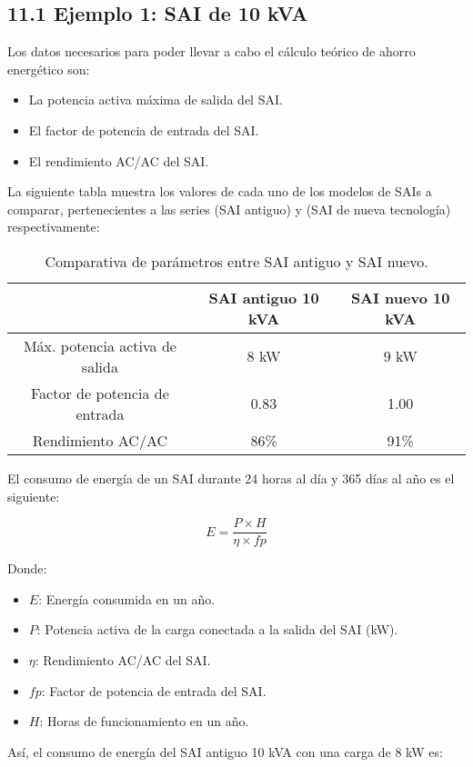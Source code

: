 \begin{Form}
\section*{11.1 Ejemplo 1: SAI de 10 kVA}

Los datos necesarios para poder llevar a cabo el cálculo teórico de ahorro energético son:
\begin{itemize}
    \item La potencia activa máxima de salida del SAI.
    \item El factor de potencia de entrada del SAI.
    \item El rendimiento AC/AC del SAI.
\end{itemize}

La siguiente tabla muestra los valores de cada uno de los modelos de SAIs a comparar, pertenecientes a las series (SAI antiguo) y (SAI de nueva tecnología) respectivamente:

\begin{table}[H]
\centering
\begin{tabular}{|c|c|c|}
\hline
\textbf{} & \textbf{SAI antiguo 10 kVA} & \textbf{SAI nuevo 10 kVA} \\
\hline
Máx. potencia activa de salida & 8 kW & 9 kW \\
\hline
Factor de potencia de entrada & 0.83 & 1.00 \\
\hline
Rendimiento AC/AC & 86\% & 91\% \\
\hline
\end{tabular}
\caption{Comparativa de parámetros entre SAI antiguo y SAI nuevo.}
\end{table}

El consumo de energía de un SAI durante 24 horas al día y 365 días al año es el siguiente:

\[
E = \frac{P \times H}{\eta \times fp}
\]

Donde:
\begin{itemize}
    \item \(E\): Energía consumida en un año.
    \item \(P\): Potencia activa de la carga conectada a la salida del SAI (kW).
    \item \(\eta\): Rendimiento AC/AC del SAI.
    \item \(fp\): Factor de potencia de entrada del SAI.
    \item \(H\): Horas de funcionamiento en un año.
\end{itemize}

Así, el consumo de energía del SAI antiguo 10 kVA con una carga de 8 kW es:


\end{Form}
